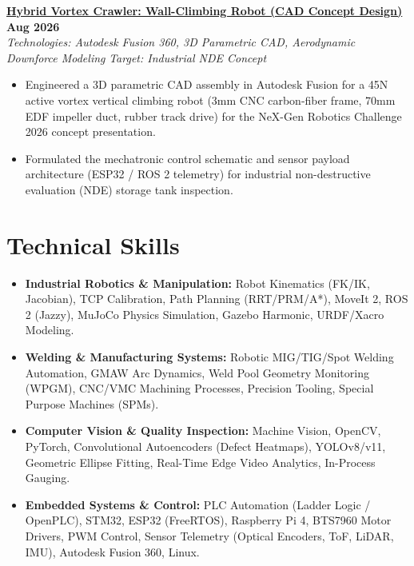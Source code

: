 \documentclass[letterpaper,10pt]{article}
\begin{document}
\noindent
\href{https://github.com/Arkz-Deepak/vortex-crawler}{\textbf{Hybrid Vortex Crawler: Wall-Climbing Robot (CAD Concept Design)}} \hfill \textbf{Aug 2026} \\
\textit{Technologies: Autodesk Fusion 360, 3D Parametric CAD, Aerodynamic Downforce Modeling} \hfill \textit{Target: Industrial NDE Concept} \\
\begin{itemize}
    \item Engineered a 3D parametric CAD assembly in Autodesk Fusion for a 45N active vortex vertical climbing robot (3mm CNC carbon-fiber frame, 70mm EDF impeller duct, rubber track drive) for the NeX-Gen Robotics Challenge 2026 concept presentation.
    \item Formulated the mechatronic control schematic and sensor payload architecture (ESP32 / ROS 2 telemetry) for industrial non-destructive evaluation (NDE) storage tank inspection.
\end{itemize}

\section{Technical Skills}
\begin{itemize}
    \item \textbf{Industrial Robotics \& Manipulation:} Robot Kinematics (FK/IK, Jacobian), TCP Calibration, Path Planning (RRT/PRM/A*), MoveIt 2, ROS 2 (Jazzy), MuJoCo Physics Simulation, Gazebo Harmonic, URDF/Xacro Modeling.
    \item \textbf{Welding \& Manufacturing Systems:} Robotic MIG/TIG/Spot Welding Automation, GMAW Arc Dynamics, Weld Pool Geometry Monitoring (WPGM), CNC/VMC Machining Processes, Precision Tooling, Special Purpose Machines (SPMs).
    \item \textbf{Computer Vision \& Quality Inspection:} Machine Vision, OpenCV, PyTorch, Convolutional Autoencoders (Defect Heatmaps), YOLOv8/v11, Geometric Ellipse Fitting, Real-Time Edge Video Analytics, In-Process Gauging.
    \item \textbf{Embedded Systems \& Control:} PLC Automation (Ladder Logic / OpenPLC), STM32, ESP32 (FreeRTOS), Raspberry Pi 4, BTS7960 Motor Drivers, PWM Control, Sensor Telemetry (Optical Encoders, ToF, LiDAR, IMU), Autodesk Fusion 360, Linux.
\end{itemize}
\end{document}
